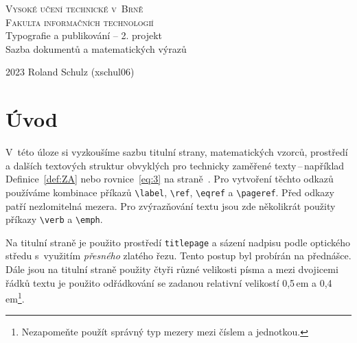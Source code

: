 \documentclass[twocolumn,a4paper,11pt]{article}
\begin{document}
\begin{titlepage}
    \begin{center}
        {\Huge \textsc{Vysoké učení technické v~Brně} \\[0.5em]} {\huge \textsc{Fakulta informačních technologií}} \\
        {\LARGE Typografie a publikování -- 2. projekt \\[0.4em] Sazba dokumentů a matematických výrazů }\\
    \end{center}

    {\Large 2023 \hfill Roland Schulz (xschul06)}
    \thispagestyle{empty}
\end{titlepage}

\clearpage
{}

\section*{Úvod}
\label{sec:intro}
V~této úloze si vyzkoušíme sazbu titulní strany, matematických vzorců, prostředí a dalších textových struktur obvyklých pro technicky zaměřené texty\,--\,například Definice~\ref{def:ZA} nebo rovnice~\eqref{eq:3} na straně~\pageref{sec:rovnice}. Pro vytvoření těchto odkazů používáme kombinace příkazů \verb|\label|, \verb|\ref|, \verb|\eqref| a \verb|\pageref|. Před odkazy patří nezlomitelná mezera. Pro zvýrazňování textu jsou zde několikrát použity příkazy \verb|\verb| a \verb|\emph|.

Na titulní straně je použito prostředí \verb|titlepage| a sázení nadpisu podle optického středu s~využitím \emph{přesného} zlatého řezu. Tento postup byl probírán na přednášce. Dále jsou na titulní straně použity čtyři různé velikosti písma a mezi dvojicemi řádků textu je použito odřádkování se zadanou relativní velikostí 0,5\,em a 0,4\,em\footnote{Nezapomeňte použít správný typ mezery mezi číslem a jednotkou.}.
\end{document}
